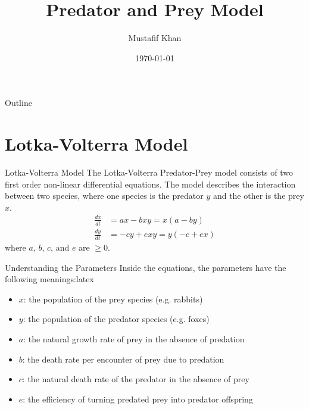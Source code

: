 \documentclass[10pt]{beamer}
\title[Predator and Prey Model]{Predator and Prey Model}
\author[Mustafif Khan]{Mustafif Khan}
\institute[TMU]{MTH630-W2024}
\date{\today}
\begin{document}
\begin{frame}
    \titlepage
\end{frame}

\begin{frame}{Outline}
    \tableofcontents
\end{frame}

\section{Lotka-Volterra Model}
\begin{frame}{Lotka-Volterra Model}
    The Lotka-Volterra Predator-Prey model consists of two first order
    non-linear differential equations. The model describes the interaction
    between
    two species, where one species is the predator $y$ and the other is the
    prey
    $x$.
    \begin{align}
        \frac{dx}{dt} & = ax - bxy = x(a-by)     \\
        \frac{dy}{dt} & = -cy + exy = y(-c + ex)
    \end{align}
    where $a$, $b$, $c$, and $e$ are $\geq 0$.
\end{frame}

\begin{frame}{Understanding the Parameters}
    Inside the equations, the parameters have the following meanings:latex

    \begin{itemize}
        \item $x$: the population of the prey species (e.g. rabbits)
        \item $y$: the population of the predator species (e.g. foxes)
        \item $a$: the natural growth rate of prey in the absence of predation
        \item $b$: the death rate per encounter of prey due to predation
        \item $c$: the natural death rate of the predator in the absence of
              prey
        \item $e$: the efficiency of turning predated prey into predator
              offspring
    \end{itemize}
\end{frame}
\end{document}
